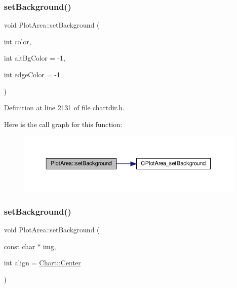\subsubsection{\texorpdfstring{set\+Background()}{setBackground()}\hspace{0.1cm}{\footnotesize\ttfamily [1/2]}}
{\footnotesize\ttfamily void Plot\+Area\+::set\+Background (\begin{DoxyParamCaption}\item[{int}]{color,  }\item[{int}]{alt\+Bg\+Color = {\ttfamily -\/1},  }\item[{int}]{edge\+Color = {\ttfamily -\/1} }\end{DoxyParamCaption})\hspace{0.3cm}{\ttfamily [inline]}}



Definition at line 2131 of file chartdir.\+h.

Here is the call graph for this function\+:
\nopagebreak
\begin{figure}[H]
\begin{center}
\leavevmode
\includegraphics[width=350pt]{class_plot_area_a04f56242f125bf96a1c6e8dc0ce74342_cgraph}
\end{center}
\end{figure}
\mbox{\label{class_plot_area_abcd924d1be7c5a3f4267f2cbbf14deaa}} 
\subsubsection{\texorpdfstring{set\+Background()}{setBackground()}\hspace{0.1cm}{\footnotesize\ttfamily [2/2]}}
{\footnotesize\ttfamily void Plot\+Area\+::set\+Background (\begin{DoxyParamCaption}\item[{const char $\ast$}]{img,  }\item[{int}]{align = {\ttfamily \hyperlink{namespace_chart_ae222e51ce11a254450b6ddfbc862680aab21c196681da027efd151236305b985d}{Chart\+::\+Center}} }\end{DoxyParamCaption})\hspace{0.3cm}{\ttfamily [inline]}}



